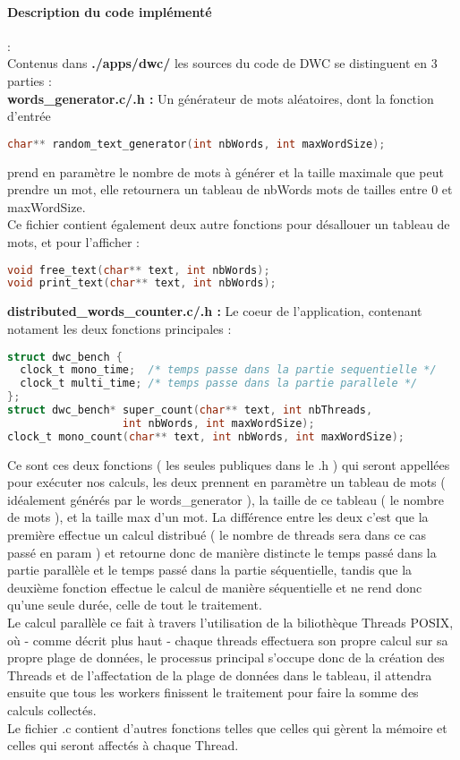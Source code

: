 \paragraph{Description du code implémenté}:\\

Contenus dans \textbf{./apps/dwc/} les sources du code de DWC se distinguent en 3 parties :\\

\textbf{words\_generator.c/.h :} Un générateur de mots aléatoires, dont la fonction d'entrée 
\begin{lstlisting}[language=C]
char** random_text_generator(int nbWords, int maxWordSize);
\end{lstlisting}
prend en paramètre le nombre de mots à générer et la taille maximale que peut prendre un mot, elle retournera un tableau de nbWords mots de tailles entre 0 et maxWordSize.\\
Ce fichier contient également deux autre fonctions pour désallouer un tableau de mots, et pour l'afficher :
\begin{lstlisting}[language=C]
void free_text(char** text, int nbWords);
void print_text(char** text, int nbWords);
\end{lstlisting}

\textbf{distributed\_words\_counter.c/.h :} Le coeur de l'application, contenant notament les deux fonctions principales :
\begin{lstlisting}[language=C]
struct dwc_bench {
  clock_t mono_time;  /* temps passe dans la partie sequentielle */
  clock_t multi_time; /* temps passe dans la partie parallele */
};
struct dwc_bench* super_count(char** text, int nbThreads, 
			      int nbWords, int maxWordSize);
clock_t mono_count(char** text, int nbWords, int maxWordSize);
\end{lstlisting}
Ce sont ces deux fonctions ( les seules publiques dans le .h ) qui seront appellées pour exécuter nos calculs, les deux prennent en paramètre un tableau de mots ( idéalement générés par le words\_generator ), la taille de ce tableau ( le nombre de mots ), et la taille max d'un mot. La différence entre les deux c'est que la première effectue un calcul distribué ( le nombre de threads sera dans ce cas passé en param ) et retourne donc de manière distincte le temps passé dans la partie parallèle et le temps passé dans la partie séquentielle, tandis que la deuxième fonction effectue le calcul de manière séquentielle et ne rend donc qu'une seule durée, celle de tout le traitement.\\
Le calcul parallèle ce fait à travers l'utilisation de la biliothèque Threads POSIX, où - comme décrit plus haut - chaque threads effectuera son propre calcul sur sa propre plage de données, le processus principal s'occupe donc de la création des Threads et de l'affectation de la plage de données dans le tableau, il attendra ensuite que tous les workers finissent le traitement pour faire la somme des calculs collectés.\\
Le fichier .c contient d'autres fonctions telles que celles qui gèrent la mémoire et celles qui seront affectés à chaque Thread.

